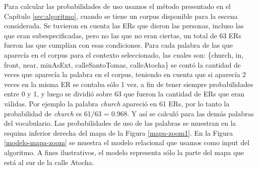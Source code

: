 
Para calcular las probabilidades de uso usamos el m\'etodo presentado en el Cap\'itulo \ref{sec:algoritmo}, cuando se tiene un corpus disponible para la escena considerada. Se tuvieron en cuenta las ERs que dieron las personas, incluso las que eran subespecificadas, pero no las que no eran ciertas, un total de 63 ERs fueron las que cumpl\'ian con esas condiciones. Para cada palabra de las que aparec\'ia en el corpus para el contexto seleccionado, las cuales son: \{church, in, front, near, minAsExt, calleSantoTomas, calleAtocha\} se cont\'o la cantidad de veces que aparec\'ia la palabra en el corpus, teniendo en cuenta que si aparec\'ia 2 veces en la misma ER se contaba s\'olo 1 vez, a fin de tener siempre probabilidades entre 0 y 1, y luego se dividi\'o sobre 63 que fueron la cantidad de ERs que eran v\'alidas. Por ejemplo la palabra {\it church} apareci\'o en 61 ERs, por lo tanto la probabilidad de {\it church} es 61/63 = 0.968. Y as\'i se calcul\'o para las dem\'as palabras del vocabulario. Las probabilidades de uso de las palabras se muestran en la esquina inferior derecha del mapa de la Figura \ref{mapa-zoom1}.
En la Figura \ref{modelo-mapa-zoom} se muestra el modelo relacional que usamos como input del algoritmo. A fines ilustrativos, el modelo representa s\'olo la parte del mapa que est\'a al sur de la calle Atocha.

